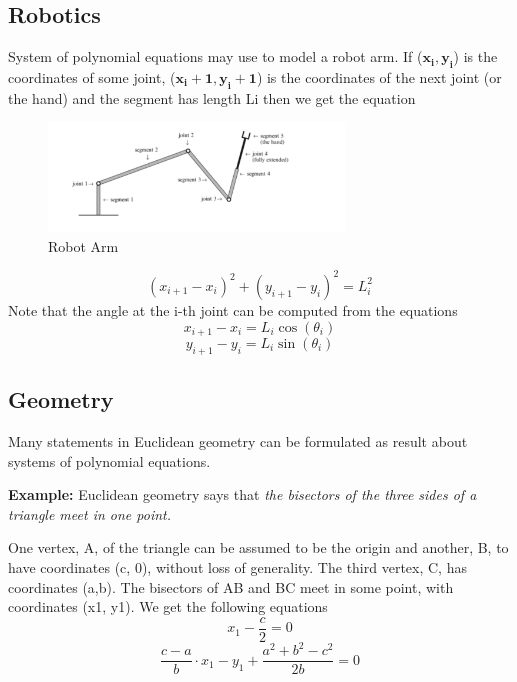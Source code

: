 \documentclass[11pt]{article}
\begin{document}
\subsection{Robotics}
System of polynomial equations may use to model a robot arm. If  ($\mathbf{x_i, y_i}$) is the coordinates of some joint,  ($\mathbf{x_i+1, y_i+1}$) is the coordinates of the next joint (or the hand) and the segment has length Li then we get the equation \cite{richterArticle}
\begin{figure}[H]
  \begin{center}
    \includegraphics[width=0.70\textwidth]{robotarm.png}
    \caption{Robot Arm}
    \label{fig: Robot Arm}
  \end{center}
\end{figure}

 \begin{equation}
    (x_{i+1}-x_i)^2 + (y_{i+1}-y_i)^2=L_i^2
\end{equation}
Note that the angle at the i-th joint can be computed from the equations
 \begin{equation}
    x_{i+1}-x_i = L_i \cos(\theta_i)
\end{equation}
 \begin{equation}
    y_{i+1}-y_i = L_i \sin(\theta_i)
\end{equation}

\subsection{Geometry}
Many statements in Euclidean geometry can be formulated as result about systems of polynomial equations.\cite{richterArticle}

\textbf {Example:} Euclidean geometry says that \textit{the bisectors of the three sides of a triangle meet in one point.}

One vertex, A, of the triangle can be assumed to be the origin and another, B, to have coordinates (c, 0), without loss of generality. The third vertex, C, has coordinates (a,b).
The bisectors of AB and BC meet in some point, with coordinates (x1, y1). We get the following equations
\begin{equation}
    x_1- \frac {c}{2}=0
\end{equation}
\begin{equation}
    \frac {c-a}{b} \cdotp x_1 - y_1 + \frac {a^2 + b^2 - c^2}{2b} = 0
\end{equation}
\end{document}
